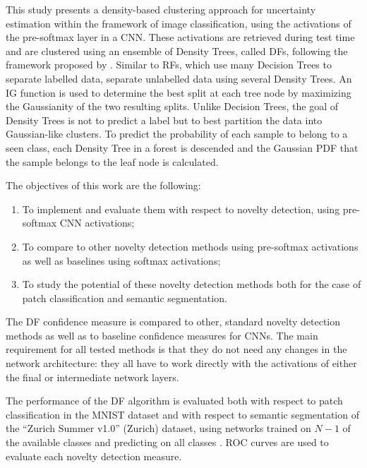 \documentclass[10pt]{article}
\begin{document}
This study presents a density-based clustering approach for uncertainty estimation within the framework of image classification, using the activations of the pre-softmax layer in a CNN. These activations are retrieved during test time and are clustered using an ensemble of Density Trees, called \glspl{DF}, following the framework proposed by \textcite{decisionForests-MSR}. Similar to \glspl{RF}, which use many Decision Trees to separate labelled data,  separate unlabelled data using several Density Trees. An \gls{IG} function is used to determine the best split at each tree node by maximizing the Gaussianity of the two resulting splits. Unlike Decision Trees, the goal of Density Trees is not to predict a label but to best partition the data into Gaussian-like clusters. To predict the probability of each sample to belong to a seen class, each Density Tree in a forest is descended and the Gaussian \gls{PDF} that the sample belongs to the leaf node is calculated. 

The objectives of this work are the following:
\begin{enumerate}
    \item To implement  and evaluate them with respect to novelty detection, using pre-softmax \gls{CNN} activations;
    \item To compare  to other novelty detection methods using pre-softmax activations as well as baselines using softmax activations;
    \item To study the potential of these novelty detection methods both for the case of patch classification and semantic segmentation.
\end{enumerate}

The \acrlong{DF} confidence measure is compared to other, standard novelty detection methods as well as to baseline confidence measures for \glspl{CNN}. The main requirement for all tested methods is that they do not need any changes in the network architecture: they all have to work directly with the activations of either the final or intermediate network layers.

The performance of the \acrlong{DF} algorithm is evaluated both with respect to patch classification in the \gls{MNIST} dataset and with respect to semantic segmentation of the ``Zurich Summer v1.0'' (Zurich) dataset, using networks trained on $N-1$ of the available classes and predicting on all classes \cite{mnist, Volpi2015SemanticSO}. \gls{ROC} curves are used to evaluate each novelty detection measure.
\end{document}
